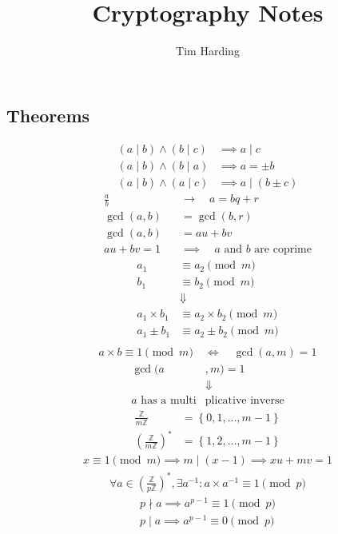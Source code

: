 \documentclass{article}
\title{Cryptography Notes}
\author{Tim Harding}
\newcommand{\curly}[1]{\left\{ #1 \right\}}
\newcommand{\soft}[1]{\left( #1 \right)}
\begin{document}
\begin{multicols*}{2}

\section*{Theorems}

\begin{align*}
    (a \mid b) \wedge (b \mid c) &\implies a \mid c \\
    (a \mid b) \wedge (b \mid a) &\implies a = \pm b \\
    (a \mid b) \wedge (a \mid c) &\implies a \mid (b \pm c)
\end{align*}
\begin{align*}
    \frac{a}{b} \quad &\longrightarrow  \quad a = bq + r \\
    \gcd(a, b) &= \gcd(b, r) \\
    \gcd(a, b) &= au + bv \\
    au + bv = 1 \quad &\implies \quad \text{$a$ and $b$ are coprime}
\end{align*}
\begin{align*}
    a_1 &\equiv a_2 \pmod{m} \\
    b_1 &\equiv b_2 \pmod{m} \\
    &\Downarrow \\
    a_1 \times b_1 &\equiv a_2 \times b_2 \pmod{m} \\
    a_1    \pm b_1 &\equiv a_2    \pm b_2 \pmod{m} \\
\end{align*}
\begin{align*}
    a \times b \equiv 1 \pmod{m} \quad \Leftrightarrow \quad \gcd(a, m) = 1
\end{align*}
\begin{align*}
    \gcd(a&, m) = 1 \\
    &\Downarrow \\
    \text{$a$ has a multi} & \text{plicative inverse}
\end{align*}
\begin{align*}
    \frac{\mathbb{Z}}{m\mathbb{Z}} &= \curly{0, 1, \ldots, m - 1} \\
    \soft{\frac{\mathbb{Z}}{m\mathbb{Z}}}^* &= \curly{1, 2, \ldots, m - 1}
\end{align*}
\begin{align*}
    x \equiv 1 \pmod{m} \implies m \mid (x - 1) \implies xu + mv = 1
\end{align*}
\begin{align*}
    \forall a \in \soft{\frac{\mathbb{Z}}{p\mathbb{Z}}}^*, \exists a^{-1} : a \times a^{-1} \equiv 1 \pmod{p}
\end{align*}
\begin{align*}
    p \nmid a \implies a^{p-1} \equiv 1 \pmod{p} \\
    p  \mid a \implies a^{p-1} \equiv 0 \pmod{p}
\end{align*}


\end{multicols*}
\end{document}
